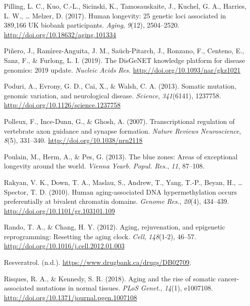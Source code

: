 \documentclass[12pt,twoside]{unicam}
\begin{document}
\begin{cslreferences}
\leavevmode\hypertarget{ref-Pilling2017}{}%
Pilling, L. C., Kuo, C.-L., Sicinski, K., Tamosauskaite, J., Kuchel, G. A., Harries, L. W., \ldots{} Melzer, D. (2017). Human longevity: 25 genetic loci associated in 389,166 UK biobank participants. \emph{Aging}, \emph{9}(12), 2504--2520. \url{http://doi.org/10.18632/aging.101334}

\leavevmode\hypertarget{ref-Pinero2019}{}%
Piñero, J., Ramı́rez-Anguita, J. M., Saüch-Pitarch, J., Ronzano, F., Centeno, E., Sanz, F., \& Furlong, L. I. (2019). The DisGeNET knowledge platform for disease genomics: 2019 update. \emph{Nucleic Acids Res.} \url{http://doi.org/10.1093/nar/gkz1021}

\leavevmode\hypertarget{ref-Poduri2013}{}%
Poduri, A., Evrony, G. D., Cai, X., \& Walsh, C. A. (2013). Somatic mutation, genomic variation, and neurological disease. \emph{Science}, \emph{341}(6141), 1237758. \url{http://doi.org/10.1126/science.1237758}

\leavevmode\hypertarget{ref-Polleux2007}{}%
Polleux, F., Ince-Dunn, G., \& Ghosh, A. (2007). Transcriptional regulation of vertebrate axon guidance and synapse formation. \emph{Nature Reviews Neuroscience}, \emph{8}(5), 331--340. \url{http://doi.org/10.1038/nrn2118}

\leavevmode\hypertarget{ref-Poulain2013}{}%
Poulain, M., Herm, A., \& Pes, G. (2013). The blue zones: Areas of exceptional longevity around the world. \emph{Vienna Yearb. Popul. Res.}, \emph{11}, 87--108.

\leavevmode\hypertarget{ref-Rakyan2010}{}%
Rakyan, V. K., Down, T. A., Maslau, S., Andrew, T., Yang, T.-P., Beyan, H., \ldots{} Spector, T. D. (2010). Human aging-associated DNA hypermethylation occurs preferentially at bivalent chromatin domains. \emph{Genome Res.}, \emph{20}(4), 434--439. \url{http://doi.org/10.1101/gr.103101.109}

\leavevmode\hypertarget{ref-Rando2012}{}%
Rando, T. A., \& Chang, H. Y. (2012). Aging, rejuvenation, and epigenetic reprogramming: Resetting the aging clock. \emph{Cell}, \emph{148}(1-2), 46--57. \url{http://doi.org/10.1016/j.cell.2012.01.003}

\leavevmode\hypertarget{ref-Resveratrol}{}%
Resveratrol. (n.d.). \url{https://www.drugbank.ca/drugs/DB02709}.

\leavevmode\hypertarget{ref-Risques2018}{}%
Risques, R. A., \& Kennedy, S. R. (2018). Aging and the rise of somatic cancer-associated mutations in normal tissues. \emph{PLoS Genet.}, \emph{14}(1), e1007108. \url{http://doi.org/10.1371/journal.pgen.1007108}


\end{cslreferences}
\end{document}
